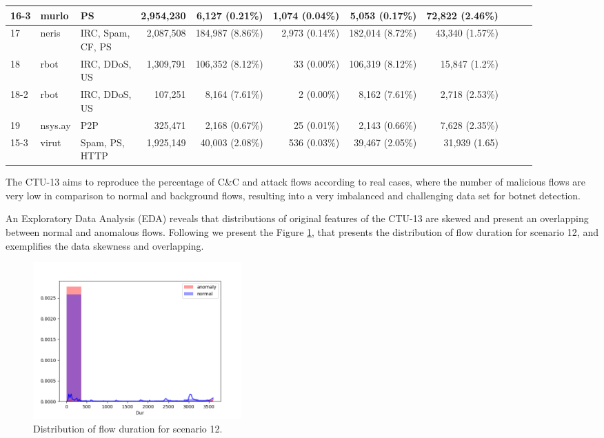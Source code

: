 \documentclass[review]{elsarticle}
\begin{document}
\begin{table}[h!]
\begin{tabular}{| l | l | l | r | r | r | r | r | r | r | r | }
			16-3 & murlo &PS & 2,954,230 & 6,127 (0.21\%) & 1,074 (0.04\%) & 5,053 (0.17\%) &72,822 (2.46\%)\\ \hline
			17 & neris &\makecell[l]{IRC, Spam,\\CF, PS} & 2,087,508 & 184,987 (8.86\%) & 2,973 (0.14\%) & 182,014 (8.72\%) &43,340 (1.57\%)\\ \hline
			18 & rbot &\makecell[l]{IRC, DDoS,\\US} & 1,309,791 & 106,352 (8.12\%) & 33 (0.00\%) & 106,319 (8.12\%) &15,847 (1.2\%)\\ \hline
			18-2 & rbot &\makecell[l]{IRC, DDoS,\\US} & 107,251 & 8,164 (7.61\%) & 2 (0.00\%) & 8,162 (7.61\%) &2,718 (2.53\%)\\ \hline
			19 & nsys.ay &P2P & 325,471 & 2,168 (0.67\%) & 25 (0.01\%) & 2,143 (0.66\%) &7,628 (2.35\%)\\ \hline
			15-3 & virut &\makecell[l]{Spam, PS,\\HTTP} & 1,925,149 & 40,003 (2.08\%) & 536 (0.03\%) & 39,467 (2.05\%) &31,939 (1.65)\\ \hline
	\end{tabular}
\end{table}

The CTU-13 aims to reproduce the percentage of C\&C and attack flows according to real cases, where the number of malicious flows are very low in comparison to normal and background flows, resulting into a very imbalanced and challenging data set for botnet detection. 

An Exploratory Data Analysis (EDA) reveals that distributions of original features of the CTU-13 are skewed and present an overlapping between normal and anomalous flows. Following we present the Figure \ref{fig:fig01}, that presents the distribution of flow duration for scenario 12, and exemplifies the data skewness and overlapping. 

\begin{figure}[h!]
     \centering
     \includegraphics[width=8cm]{figures/raw_distplot_capture20110812_Dur.png}
     \caption{Distribution of flow duration for scenario 12.}
     \label{fig:fig01}
\end{figure}
\end{document}
